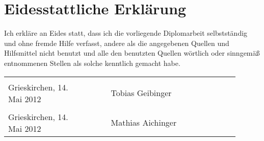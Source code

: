 
{}

\section*{Eidesstattliche Erklärung}

Ich erkläre an Eides statt, dass ich die vorliegende Diplomarbeit selbstständig und ohne fremde Hilfe verfasst, andere als die angegebenen Quellen und Hilfsmittel nicht benutzt und alle den benutzten Quellen wörtlich oder sinngemäß entnommenen Stellen als solche kenntlich gemacht habe.
\begin{flushleft}
	\footnotesize
	\begin{tabular}{@{}p{0.3\linewidth}p{0.1\linewidth}>{\centering\arraybackslash}p{0.5\linewidth}}
		& & \\ \cline{3-3} Grieskirchen, 14. Mai 2012 & & Tobias Geibinger \\ [2\baselineskip]
		& & \\ \cline{3-3} Grieskirchen, 14. Mai 2012 & & Mathias Aichinger \\
	\end{tabular}
\end{flushleft}

%
%
